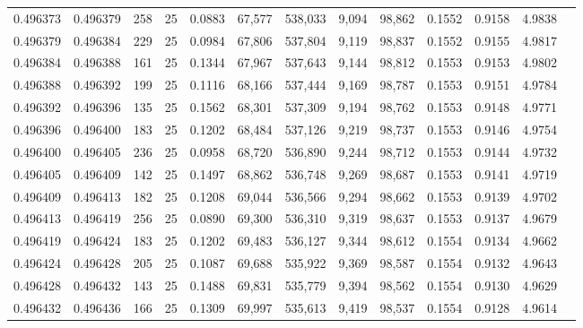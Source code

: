 \begin{tabular}{rrrrrrrrrrrrr}
0.496373 & 0.496379 & 258 &  25 &                                     0.0883 &  67,577 & 538,033 &   9,094 &  98,862 & 0.1552 & 0.9158 & 4.9838 \\
0.496379 & 0.496384 & 229 &  25 &                                     0.0984 &  67,806 & 537,804 &   9,119 &  98,837 & 0.1552 & 0.9155 & 4.9817 \\
0.496384 & 0.496388 & 161 &  25 &                                     0.1344 &  67,967 & 537,643 &   9,144 &  98,812 & 0.1553 & 0.9153 & 4.9802 \\
0.496388 & 0.496392 & 199 &  25 &                                     0.1116 &  68,166 & 537,444 &   9,169 &  98,787 & 0.1553 & 0.9151 & 4.9784 \\
0.496392 & 0.496396 & 135 &  25 &                                     0.1562 &  68,301 & 537,309 &   9,194 &  98,762 & 0.1553 & 0.9148 & 4.9771 \\
0.496396 & 0.496400 & 183 &  25 &                                     0.1202 &  68,484 & 537,126 &   9,219 &  98,737 & 0.1553 & 0.9146 & 4.9754 \\
0.496400 & 0.496405 & 236 &  25 &                                     0.0958 &  68,720 & 536,890 &   9,244 &  98,712 & 0.1553 & 0.9144 & 4.9732 \\
0.496405 & 0.496409 & 142 &  25 &                                     0.1497 &  68,862 & 536,748 &   9,269 &  98,687 & 0.1553 & 0.9141 & 4.9719 \\
0.496409 & 0.496413 & 182 &  25 &                                     0.1208 &  69,044 & 536,566 &   9,294 &  98,662 & 0.1553 & 0.9139 & 4.9702 \\
0.496413 & 0.496419 & 256 &  25 &                                     0.0890 &  69,300 & 536,310 &   9,319 &  98,637 & 0.1553 & 0.9137 & 4.9679 \\
0.496419 & 0.496424 & 183 &  25 &                                     0.1202 &  69,483 & 536,127 &   9,344 &  98,612 & 0.1554 & 0.9134 & 4.9662 \\
0.496424 & 0.496428 & 205 &  25 &                                     0.1087 &  69,688 & 535,922 &   9,369 &  98,587 & 0.1554 & 0.9132 & 4.9643 \\
0.496428 & 0.496432 & 143 &  25 &                                     0.1488 &  69,831 & 535,779 &   9,394 &  98,562 & 0.1554 & 0.9130 & 4.9629 \\
0.496432 & 0.496436 & 166 &  25 &                                     0.1309 &  69,997 & 535,613 &   9,419 &  98,537 & 0.1554 & 0.9128 & 4.9614 \\

\end{tabular}
